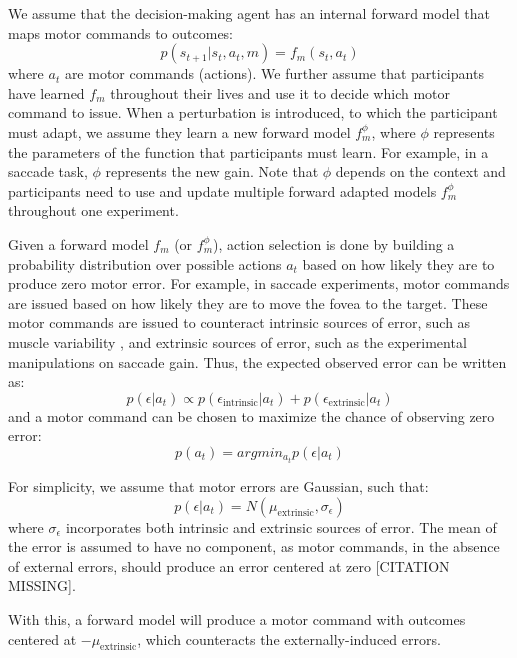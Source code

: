 \documentclass[a4paper,doc,floatsintext,natbib]{apa6}
\begin{document}
We assume that the decision-making agent has an internal forward model that
maps motor commands to outcomes:
\begin{equation}
p(s_{t+1} | s_t, a_t, m) = f_m(s_t, a_t)
\end{equation}
where $a_t$ are motor commands (actions). We further assume that participants
have learned $f_m$ throughout their lives and use it to decide which motor
command to issue. When a perturbation is introduced, to which the participant
must adapt, we assume they learn a new forward model $f_m^{\phi}$, where $\phi$
represents the parameters of the function that participants must learn. For
example, in a saccade task, $\phi$ represents the new gain. Note that $\phi$
depends on the context and participants need to use and update multiple
forward adapted models $f_m^{\phi}$ throughout one experiment.

Given a forward model $f_m$ (or $f_m^\phi$), action selection is done by
building a probability distribution over possible actions $a_t$ based on how
likely they are to produce zero motor error. For example, in saccade
experiments, motor commands are issued based on how likely they are to move the
fovea to the target. These motor commands are issued to counteract intrinsic
sources of error, such as muscle variability , and extrinsic
sources of error, such as the experimental manipulations on saccade gain. Thus,
the expected observed error can be written as:
\begin{equation}
p(\epsilon | a_t) \propto p(\epsilon_{\text{intrinsic}} | a_t) + p(\epsilon_{\text{extrinsic}} | a_t)
\end{equation}
and a motor command can be chosen to maximize the chance of observing zero error:
\begin{equation}
p(a_t) = argmin_{a_t} p(\epsilon | a_t)
\end{equation}

For simplicity, we assume that motor errors are Gaussian, such that:
\begin{equation}
p(\epsilon | a_t) = N(\mu_{\text{extrinsic}}, \sigma_\epsilon)
\end{equation}
where $\sigma_\epsilon$ incorporates both intrinsic and extrinsic sources of
error. The mean of the error is assumed to have no component, as motor
commands, in the absence of external errors, should produce an error centered
at zero [CITATION MISSING].

With this, a forward model will produce a motor command with outcomes centered
at $-\mu_{\text{extrinsic}}$, which counteracts the externally-induced errors.
\end{document}
